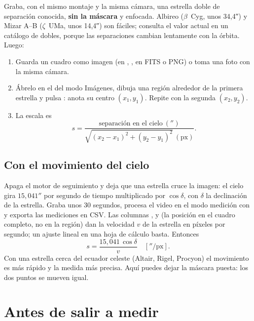 Graba, con el mismo montaje y la misma cámara, una estrella doble de separación conocida, \textbf{sin la máscara} y
enfocada. Albireo ($\beta$~Cyg, unos 34,4″) y Mizar A–B ($\zeta$~UMa, unos 14,4″) son fáciles; consulta el valor actual en
un catálogo de dobles, porque las separaciones cambian lentamente con la órbita. Luego:
\begin{enumerate}
\item Guarda un cuadro como imagen (en , , en FITS o PNG) o
toma una foto con la misma cámara.
\item Ábrelo en el  del modo Imágenes, dibuja una región alrededor de la primera estrella y pulsa
: anota su centro $(x_1, y_1)$. Repite con la segunda $(x_2, y_2)$.
\item La escala es
\[
s = \frac{\text{separación en el cielo}\ ('')}{\sqrt{(x_2-x_1)^2 + (y_2-y_1)^2}\ (\text{px})} .
\]
\end{enumerate}

\subsection{Con el movimiento del cielo}

Apaga el motor de seguimiento y deja que una estrella cruce la imagen: el cielo gira $15{,}041''$ por segundo de tiempo
multiplicado por $\cos\delta$, con $\delta$ la declinación de la estrella. Graba unos 30 segundos, procesa el video en el
modo medición con  y exporta las mediciones en CSV. Las columnas ,  y  (la posición en el cuadro completo, no
en la región) dan la velocidad $v$ de la estrella en píxeles por
segundo; un ajuste lineal en una hoja de cálculo basta. Entonces
\[
s = \frac{15{,}041\,\cos\delta}{v}\quad[''/\text{px}] .
\]
Con una estrella cerca del ecuador celeste (Altair, Rigel, Procyon) el movimiento es más rápido y la medida más precisa.
Aquí puedes dejar la máscara puesta: los dos puntos se mueven igual.

\section{Antes de salir a medir}


